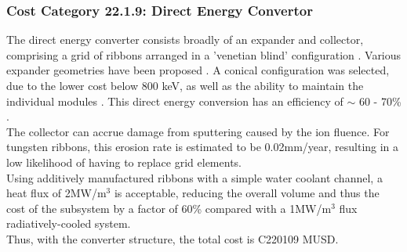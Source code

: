 \subsubsection*{Cost Category 22.1.9: Direct Energy Convertor}

The direct energy converter consists broadly of an expander and collector, comprising a grid of ribbons arranged in a 'venetian blind' configuration \cite{post1970mirror}. Various expander geometries have been proposed \cite{post1970mirror}. A conical configuration was selected, due to the lower cost below 800 keV, as well as the ability to maintain the individual modules \cite{barr1974preliminary}. This direct energy conversion has an efficiency of $\sim$ 60 - 70\% \cite{moir1973venetian}.\\

The collector can accrue damage from sputtering caused by the ion fluence. For tungsten ribbons, this erosion rate is estimated to be 0.02mm/year, resulting in a low likelihood of having to replace grid elements.\\

Using additively manufactured ribbons with a simple water coolant channel, a heat flux of 2MW/m$^3$ is acceptable, reducing the overall volume and thus the cost of the subsystem by a factor of 60\% compared with a 1MW/m$^3$ flux radiatively-cooled system.\\

 Thus, with the converter structure, the total cost is C220109 MUSD.


\begin{table}[h]
    \centering
    \caption{Cost Table}
    \label{tab:cost-table}
\end{table}
